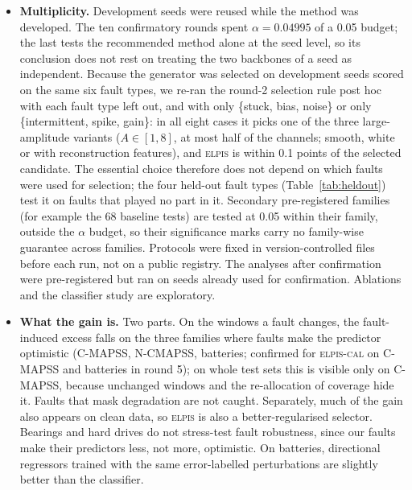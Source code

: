 \documentclass{esannV2}
\newcommand{\RPT}{\textsc{elpis}}
\newcommand{\AUTO}{\textsc{elpis-cal}}
\begin{document}
\begin{itemize}
\item \textbf{Multiplicity.} Development seeds were reused while the method was developed. The ten confirmatory rounds spent $\alpha=0.04995$ of a 0.05 budget; the last tests the recommended method alone at the seed level, so its conclusion does not rest on treating the two backbones of a seed as independent. Because the generator was selected on development seeds scored on the same six fault types, we re-ran the round-2 selection rule post hoc with each fault type left out, and with only \{stuck, bias, noise\} or only \{intermittent, spike, gain\}: in all eight cases it picks one of the three large-amplitude variants ($A\in[1,8]$, at most half of the channels; smooth, white or with reconstruction features), and \RPT{} is within 0.1 points of the selected candidate. The essential choice therefore does not depend on which faults were used for selection; the four held-out fault types (Table~\ref{tab:heldout}) test it on faults that played no part in it. Secondary pre-registered families (for example the 68 baseline tests) are tested at 0.05 within their family, outside the $\alpha$ budget, so their significance marks carry no family-wise guarantee across families. Protocols were fixed in version-controlled files before each run, not on a public registry. The analyses after confirmation were pre-registered but ran on seeds already used for confirmation. Ablations and the classifier study are exploratory.
\item \textbf{What the gain is.} Two parts. On the windows a fault changes, the fault-induced excess falls on the three families where faults make the predictor optimistic (C-MAPSS, N-CMAPSS, batteries; confirmed for \AUTO{} on C-MAPSS and batteries in round 5); on whole test sets this is visible only on C-MAPSS, because unchanged windows and the re-allocation of coverage hide it. Faults that mask degradation are not caught. Separately, much of the gain also appears on clean data, so \RPT{} is also a better-regularised selector. Bearings and hard drives do not stress-test fault robustness, since our faults make their predictors less, not more, optimistic. On batteries, directional regressors trained with the same error-labelled perturbations are slightly better than the classifier.

\end{itemize}
\end{document}
